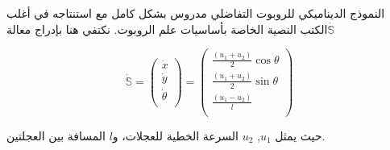 النموذج الديناميكي للروبوت التفاضلي مدروس بشكل كامل مع استنتاجه في أغلب الكتب النصية الخاصة بأساسيات علم الروبوت. نكتفي هنا بإدراج معالة$  \dot{\mathbb{S}\ } $

\begin{equation}
\dot{\mathbb{S}}=\left(\begin{matrix}\dot{x}\\\dot{y}\\\dot{\theta}\\\end{matrix}\right)=\left(\begin{matrix}\frac{\left(u_1+u_2\right)}{2}\cos {\theta}\\\frac{\left(u_1+u_2\right)}{2}\sin{\theta}\\\frac{\left(u_1-u_2\right)}{l}\\\end{matrix}\right)
\end{equation}

حيث يمثل $ u_1 $, $ u_2 $ السرعة الخطية للعجلات، و$ l $ المسافة بين العجلتين.

